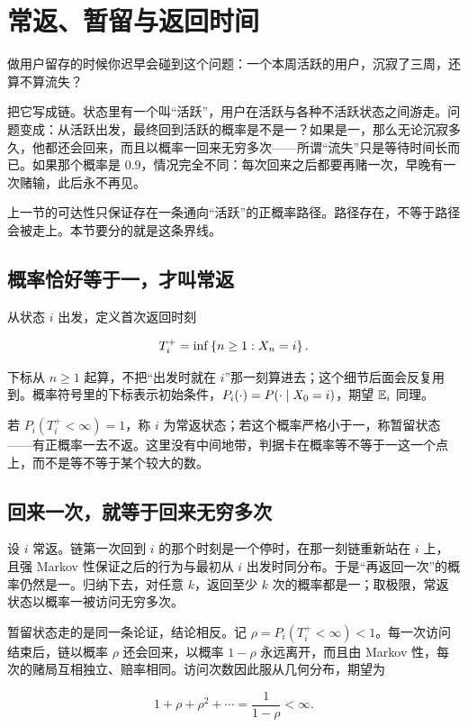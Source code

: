 \section{常返、暂留与返回时间}
\label{sec:06-Random-Processes/03-Markov-Chains/03}

做用户留存的时候你迟早会碰到这个问题：一个本周活跃的用户，沉寂了三周，还算不算流失？

把它写成链。状态里有一个叫``活跃''，用户在活跃与各种不活跃状态之间游走。问题变成：从活跃出发，最终回到活跃的概率是不是一？如果是一，那么无论沉寂多久，他都还会回来，而且以概率一回来无穷多次——所谓``流失''只是等待时间长而已。如果那个概率是 \(0.9\)，情况完全不同：每次回来之后都要再赌一次，早晚有一次赌输，此后永不再见。

上一节的可达性只保证存在一条通向``活跃''的正概率路径。路径存在，不等于路径会被走上。本节要分的就是这条界线。

\subsection{概率恰好等于一，才叫常返}

从状态 \(i\) 出发，定义首次返回时刻

\[
T_i^+=\inf\left\{n\ge1:X_n=i\right\}.
\]

下标从 \(n\ge1\) 起算，不把``出发时就在 \(i\)''那一刻算进去；这个细节后面会反复用到。概率符号里的下标表示初始条件，\(P_i(\cdot)=P(\cdot\mid X_0=i)\)，期望 \(\mathbb{E}_i\) 同理。

若 \(P_i(T_i^+<\infty)=1\)，称 \(i\) 为常返状态；若这个概率严格小于一，称暂留状态——有正概率一去不返。这里没有中间地带，判据卡在概率等不等于一这一个点上，而不是等不等于某个较大的数。

\subsection{回来一次，就等于回来无穷多次}

设 \(i\) 常返。链第一次回到 \(i\) 的那个时刻是一个停时，在那一刻链重新站在 \(i\) 上，且强 Markov 性保证之后的行为与最初从 \(i\) 出发时同分布。于是``再返回一次''的概率仍然是一。归纳下去，对任意 \(k\)，返回至少 \(k\) 次的概率都是一；取极限，常返状态以概率一被访问无穷多次。

暂留状态走的是同一条论证，结论相反。记 \(\rho=P_i(T_i^+<\infty)<1\)。每一次访问结束后，链以概率 \(\rho\) 还会回来，以概率 \(1-\rho\) 永远离开，而且由 Markov 性，每次的赌局互相独立、赔率相同。访问次数因此服从几何分布，期望为

\[
1+\rho+\rho^2+\cdots=\frac1{1-\rho}<\infty.
\]

